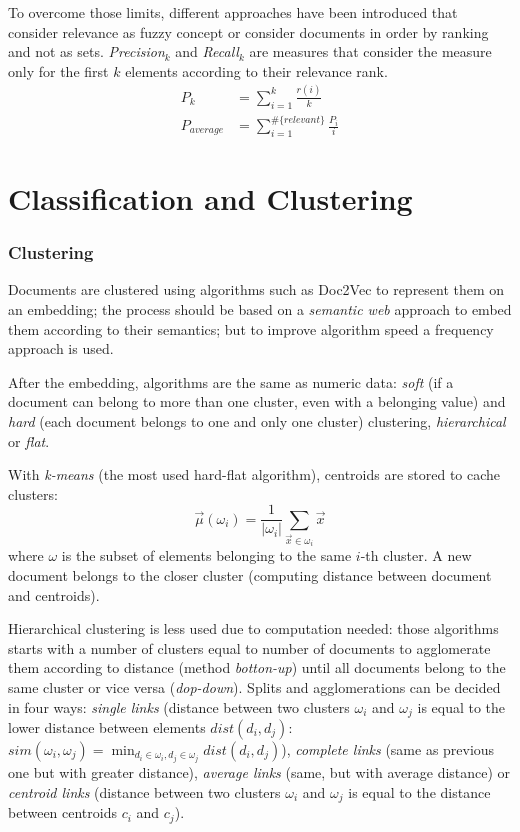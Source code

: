 \documentclass[11pt, a4page]{article}
\begin{document}
To overcome those limits, different approaches have been introduced that consider relevance as fuzzy concept or consider documents in order by ranking and not as sets.
\textit{Precision}$_k$ and \textit{Recall}$_k$ are measures that consider the measure only for the first $k$ elements according to their relevance rank.
\begin{align*}
  P_k &= \sum_{i=1}^k \frac{r(i)}{k} \\
  P_{average} &= \sum_{i=1}^{\#\{relevant\}} \frac{P_i}{i}  %
\end{align*}

\newpage
\part{Classification and Clustering}

\section{Clustering}
Documents are clustered using algorithms such as Doc2Vec to represent them on an embedding; the process should be based on a \textit{semantic web} approach to embed them according to their semantics; but to improve algorithm speed a frequency approach is used.

After the embedding, algorithms are the same as numeric data: \textit{soft} (if a document can belong to more than one cluster, even with a belonging value) and \textit{hard} (each document belongs to one and only one cluster) clustering, \textit{hierarchical} or \textit{flat}.
\newline

With \textit{k-means} (the most used hard-flat algorithm), centroids are stored to cache clusters:
\begin{equation*}
  \vec{\mu}(\omega_i) = \frac{1}{|\omega_i|}\sum_{\vec{x} \in \omega_i}\vec{x}
\end{equation*}
where $\omega$ is the subset of elements belonging to the same $i$-th cluster.
A new document belongs to the closer cluster (computing distance between document and centroids).

Hierarchical clustering is less used due to computation needed: those algorithms starts with a number of clusters equal to number of documents to agglomerate them according to distance (method \textit{botton-up}) until all documents belong to the same cluster or vice versa (\textit{dop-down}).
Splits and agglomerations can be decided in four ways: \textit{single links} (distance between two clusters $\omega_i$ and $\omega_j$ is equal to the lower distance between elements $dist(d_i, d_j)$: $sim(\omega_i, \omega_j) = \displaystyle \min_{d_i \in \omega_i, d_j \in \omega_j} dist(d_i, d_j)$), \textit{complete links} (same as previous one but with greater distance), \textit{average links} (same, but with average distance) or \textit{centroid links} (distance between two clusters $\omega_i$ and $\omega_j$ is equal to the distance between centroids $c_i$ and $c_j$).
\end{document}
